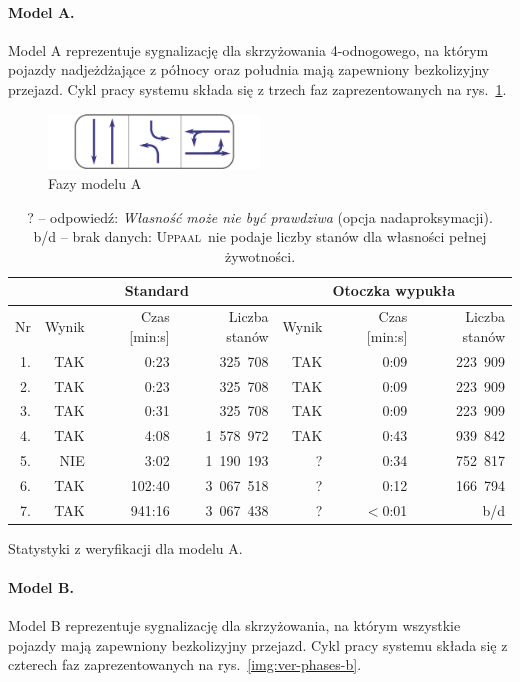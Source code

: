 \documentclass{pracamgr}
\newcommand{\imgr}[1]{rys.~\ref{#1}}
\newcommand{\upp}{\textsc{Uppaal}}
\theoremstyle{plain}
\begin{document}
\paragraph{Model A.} Model A reprezentuje sygnalizację dla skrzyżowania
4-odnogowego, na którym pojazdy nadjeżdżające z północy oraz południa
mają zapewniony bezkolizyjny przejazd. Cykl pracy systemu składa się z
trzech faz zaprezentowanych na \imgr{img:ver-phases-a}.

\begin{figure}[ht]
  \centering
  \includegraphics[width=0.5\textwidth]{img/ver-a-cycle}
  \caption{Fazy modelu A}
  \label{img:ver-phases-a}
\end{figure}
\begin{table}[ht]
  \centering
  \begin{tabular}{|r||r|r|r||r|r|r||}
    \hline
    & \multicolumn{3}{c||}{\bf Standard} & \multicolumn{3}{c||}{\bf
      Otoczka wypukła} \\ \hline
    Nr   & Wynik & Czas [min:s] & Liczba stanów & Wynik & Czas [min:s] &
    Liczba stanów \\ \hline
    1. & TAK & 0:23   &  325~708 & TAK & 0:09 & 223~909 \\
    2. & TAK & 0:23   &  325~708 & TAK & 0:09 & 223~909 \\
    3. & TAK & 0:31   &  325~708 & TAK & 0:09 & 223~909 \\
    4. & TAK & 4:08   & 1~578~972 & TAK & 0:43 & 939~842 \\
    5. & NIE & 3:02   & 1~190~193 & ?   & 0:34 & 752~817 \\
    6. & TAK & 102:40 & 3~067~518 & ?   & 0:12 & 166~794 \\
    7. & TAK & 941:16 & 3~067~438 & ?   & $<$0:01   &     b/d  
    \\\hline
  \end{tabular}
  \caption{Statystyki z weryfikacji dla modelu A.}
  \caption*{\footnotesize ? -- odpowiedź: \emph{Własność może nie być
      prawdziwa} (opcja nadaproksymacji).\\
    b/d -- brak danych: \upp\ nie podaje liczby stanów dla
    własności pełnej żywotności.
  }
  \label{tab:ver-stats-a}
\end{table}

\paragraph{Model B.} Model B reprezentuje sygnalizację dla
skrzyżowania, na którym wszystkie pojazdy mają zapewniony bezkolizyjny
przejazd. Cykl pracy systemu składa się z czterech faz
zaprezentowanych na \imgr{img:ver-phases-b}.
\end{document}
